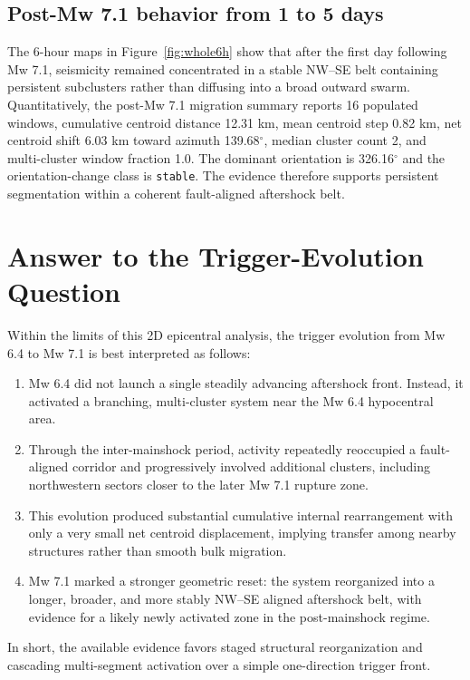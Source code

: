 \documentclass[11pt]{article}
\begin{document}
\subsection{Post-Mw 7.1 behavior from 1 to 5 days}
The 6-hour maps in Figure~\ref{fig:whole6h} show that after the first day following Mw 7.1, seismicity remained concentrated in a stable NW--SE belt containing persistent subclusters rather than diffusing into a broad outward swarm. Quantitatively, the post-Mw 7.1 migration summary reports 16 populated windows, cumulative centroid distance 12.31 km, mean centroid step 0.82 km, net centroid shift 6.03 km toward azimuth 139.68$^{\circ}$, median cluster count 2, and multi-cluster window fraction 1.0. The dominant orientation is 326.16$^{\circ}$ and the orientation-change class is \texttt{stable}. The evidence therefore supports persistent segmentation within a coherent fault-aligned aftershock belt.

\section{Answer to the Trigger-Evolution Question}
Within the limits of this 2D epicentral analysis, the trigger evolution from Mw 6.4 to Mw 7.1 is best interpreted as follows:
\begin{enumerate}[leftmargin=1.5em]
    \item Mw 6.4 did not launch a single steadily advancing aftershock front. Instead, it activated a branching, multi-cluster system near the Mw 6.4 hypocentral area.
    \item Through the inter-mainshock period, activity repeatedly reoccupied a fault-aligned corridor and progressively involved additional clusters, including northwestern sectors closer to the later Mw 7.1 rupture zone.
    \item This evolution produced substantial cumulative internal rearrangement with only a very small net centroid displacement, implying transfer among nearby structures rather than smooth bulk migration.
    \item Mw 7.1 marked a stronger geometric reset: the system reorganized into a longer, broader, and more stably NW--SE aligned aftershock belt, with evidence for a likely newly activated zone in the post-mainshock regime.
\end{enumerate}
In short, the available evidence favors staged structural reorganization and cascading multi-segment activation over a simple one-direction trigger front.
\end{document}
